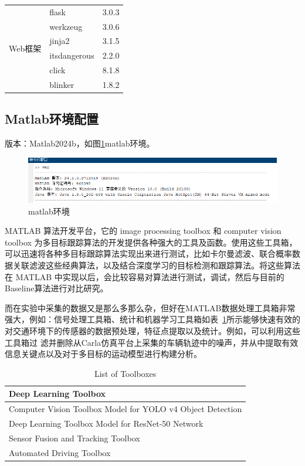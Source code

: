 \begin{table}[htbp]
\begin{tabular}{lll}
		\hline
		\multirow{6}{*}{Web框架}
		& flask & 3.0.3 \\
		& werkzeug & 3.0.6 \\
		& jinja2 & 3.1.5 \\
		& itsdangerous & 2.2.0 \\
		& click & 8.1.8 \\
		& blinker & 1.8.2 \\
		
		
		
		\hline
	\end{tabular}
\end{table}


\subsection{Matlab环境配置}

版本：Matlab2024b，如图\ref{fig:p7}matlab环境。


\begin{figure}[htbp] %
	\centering
	\includegraphics[width=1\textwidth]{p7} %
	\caption{matlab环境} %
	\label{fig:p7} %
\end{figure}


MATLAB 算法开发平台，它的 image processing toolbox 和 computer vision toolbox 为多目标跟踪算法的开发提供各种强大的工具及函数。使用这些工具箱，可以迅速将各种多目标跟踪算法实现出来进行测试，比如卡尔曼滤波、联合概率数据关联滤波这些经典算法，以及结合深度学习的目标检测和跟踪算法。将这些算法在 MATLAB 中实现以后，会比较容易对算法进行测试，调试，然后与目前的Baseline算法进行对比研究。


而在实验中采集的数据又是那么多那么杂，但好在MATLAB数据处理工具箱非常强大，例如：信号处理工具箱、统计和机器学习工具箱如表~\ref{tab:toolboxes}所示能够快速有效的对交通环境下的传感器的数据预处理，特征点提取以及统计。例如，可以利用这些工具箱过 滤并删除从Carla仿真平台上采集的车辆轨迹中的噪声，并从中提取有效信息关键点以及对于多目标的运动模型进行构建分析。

	\begin{table}[h]
		\centering
		\begin{tabular}{|>{\raggedright\arraybackslash}p{}|}
			\hline
			\textbf{Deep Learning Toolbox} \\
			\hline
			Computer Vision Toolbox Model for YOLO v4 Object Detection \\
			\hline
			Deep Learning Toolbox Model for ResNet-50 Network \\
			\hline
			Sensor Fusion and Tracking Toolbox \\
			\hline
			Automated Driving Toolbox \\
			\hline
		\end{tabular}
		\caption{List of Toolboxes}
		\label{tab:toolboxes}
	\end{table}

